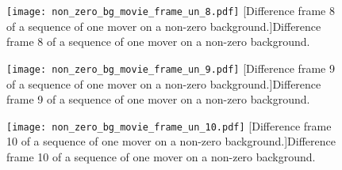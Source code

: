 \begin{figure}[!ht]
	\centering
	\texttt{[image: non\_zero\_bg\_movie\_frame\_un\_8.pdf]}
	[Difference frame 8 of a sequence of one mover on a non-zero background.]{Difference frame 8 of a sequence of one mover on a non-zero background.}
	\label{fig:non_zero_bg_movie_frame_un_3}
\end{figure}

\begin{figure}[!ht]
	\centering
	\texttt{[image: non\_zero\_bg\_movie\_frame\_un\_9.pdf]}
	[Difference frame 9 of a sequence of one mover on a non-zero background.]{Difference frame 9 of a sequence of one mover on a non-zero background.}
	\label{fig:non_zero_bg_movie_frame_un_3}
\end{figure}

\clearpage

\begin{figure}[!ht]
	\centering
	\texttt{[image: non\_zero\_bg\_movie\_frame\_un\_10.pdf]}
	[Difference frame 10 of a sequence of one mover on a non-zero background.]{Difference frame 10 of a sequence of one mover on a non-zero background.}
	\label{fig:non_zero_bg_movie_frame_un_3}
\end{figure}


